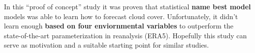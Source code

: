 In this ``proof of concept'' study it was proven that statistical \textbf{name best model} models was able to learn how to forecast cloud cover. Unfortunately, it didn't learn enough \textbf{based on four enviornmental variables} to outperform the state-of-the-art parameterization in reanalysis (ERA5). Hopefully this study can serve as motivation and a suitable starting point for similar studies. 
\cleardoublepage